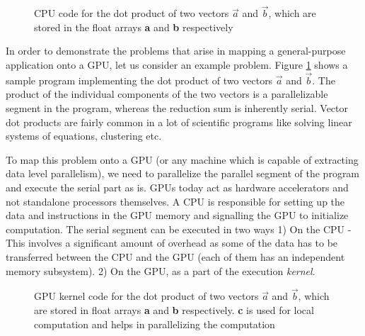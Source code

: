 %
%

\label{sec:motivation}
\begin{figure}
	
	\caption{CPU code for the dot product of two vectors $\vec{a}$ and $\vec{b}$, which are stored in the float arrays \textbf{a} and \textbf{b} respectively
		\label{fig:cpu_vector_dot_code}}
\end{figure}
\par{In order to demonstrate the problems that arise in mapping a general-purpose application onto a GPU, let us consider an example problem. Figure \ref{fig:cpu_vector_dot_code} shows a sample program implementing the dot product of two vectors $\vec{a}$ and $\vec{b}$. The product of the individual components of the two vectors is a parallelizable segment in the program, whereas the reduction sum is inherently serial. Vector dot products are fairly common in a lot of scientific programs like solving linear systems of equations, clustering etc.}

\par{To map this problem onto a GPU (or any machine which is capable of extracting data level parallelism), we need to parallelize the parallel segment of the program and execute the serial part as is. GPUs today act as hardware accelerators and not standalone processors themselves. A CPU is responsible for setting up the data and instructions in the GPU memory and signalling the GPU to initialize computation. The serial segment can be executed in two ways 1) On the CPU - This involves a significant amount of overhead as some of the data has to be transferred between the CPU and the GPU (each of them has an independent memory subsystem). 2) On the GPU, as a part of the execution \textit{kernel}.}

\begin{figure}
	\centering
	
	\caption{GPU kernel code for the dot product of two vectors $\vec{a}$ and $\vec{b}$, which are stored in float arrays \textbf{a} and \textbf{b} respectively. \textbf{c} is used for local computation and helps in parallelizing the computation
		\label{fig:gpu_vector_dot_code}}
\end{figure}

